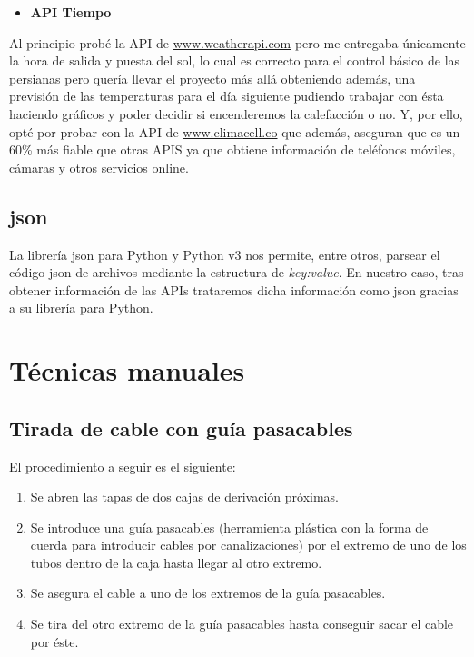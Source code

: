 \begin{itemize}
    \item \textbf{API Tiempo}
\end{itemize}
Al principio probé la API de \url{www.weatherapi.com} pero me entregaba únicamente la hora de salida y puesta del sol, lo cual es correcto para el control básico de las persianas pero quería llevar el proyecto más allá obteniendo además, una previsión de las temperaturas para el día siguiente pudiendo trabajar con ésta haciendo gráficos y poder decidir si encenderemos la calefacción o no. Y, por ello, opté por probar con la API de \url{www.climacell.co} que además, aseguran que es un 60\% más fiable que otras APIS ya que obtiene información de teléfonos móviles, cámaras y otros servicios online.

\subsection{json}
La librería json\cite{misc:Json} para Python\cite{misc:Python} y Python v3 nos permite, entre otros, parsear el código json\cite{misc:Json} de archivos mediante la estructura de \textit{key:value}. En nuestro caso, tras obtener información de las APIs trataremos dicha información como json\cite{misc:Json} gracias a su librería para Python\cite{misc:Python}.

\section{Técnicas manuales}

\subsection{Tirada de cable con guía pasacables}
El procedimiento a seguir es el siguiente:
\begin{enumerate}
        \item Se abren las tapas de dos cajas de derivación próximas.
        \item Se introduce una guía pasacables (herramienta plástica con la forma de cuerda para introducir cables por canalizaciones) por el extremo de uno de los tubos dentro de la caja hasta llegar al otro extremo.
        \item Se asegura el cable a uno de los extremos de la guía pasacables.
        \item Se tira del otro extremo de la guía pasacables hasta conseguir sacar el cable por éste.
\end{enumerate}

